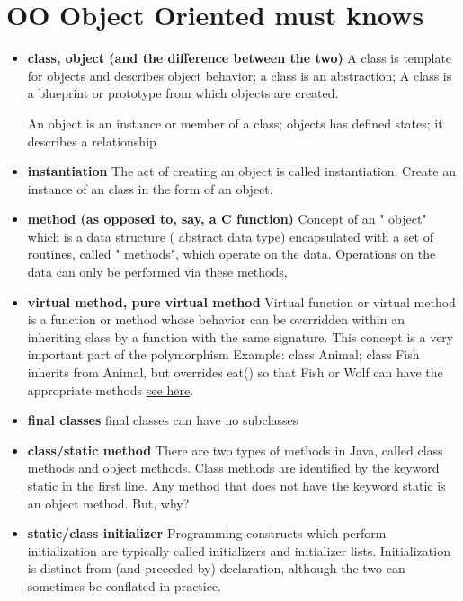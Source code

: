 \documentclass[letterpaper]{article}
\begin{document}
\section{OO Object Oriented must knows}

\begin{itemize}
\item {\bf class, object (and the difference between the two)}
  	A class is template for objects and describes object behavior; a class is
    an abstraction; A class is a blueprint or prototype from which objects 
    are created.

	An object is an instance or member of a class; objects has defined 
    states; it describes a relationship
  
\item {\bf instantiation
}	The act of creating an object is called instantiation.
	Create an instance of an class in the form of an object.

\item {\bf method (as opposed to, say, a C function)
}	Concept of an " object" which is a data structure ( abstract data type) 
	encapsulated with a set of routines, called " methods", which operate 
	on the data. Operations on the data can only be performed via these 
	methods,

\item {\bf virtual method, pure virtual method
}	Virtual function or virtual method is a function or method whose behavior 
	can be overridden within an inheriting class by a function with the same signature. This concept is a very important part of the polymorphism
	Example: class Animal; class Fish inherits from Animal, but overrides eat()
	so that Fish or Wolf can have the appropriate methods \href{http://en.wikipedia.org/wiki/Virtual_function}
	{see here}.

\item {\bf final classes}
	final classes can have no subclasses

\item {\bf class/static method
}	There are two types of methods in Java, called class methods and object methods. Class methods are identified by the keyword static in the first line. Any method that does not have the keyword static is an object method.
	But, why? 

\item {\bf static/class initializer
}	 Programming constructs which perform initialization are typically called 
	 initializers and initializer lists. Initialization is distinct from 
	 (and preceded by) declaration, although the two can sometimes be 
	 conflated in practice.



\end{itemize}
\end{document}
